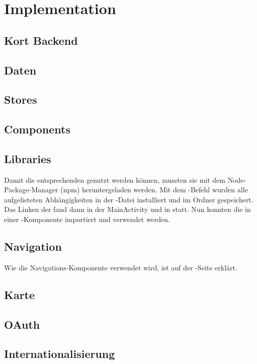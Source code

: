 \chapter{Implementation}
\label{pd-implementation}


\section{Kort Backend}


\section{Daten}


\section{Stores}


\section{Components}


\section{Libraries}
Damit die entsprechenden  genutzt werden können, mussten sie mit dem Node-Package-Manager (npm) heruntergeladen werden. 
Mit dem -Befehl wurden alle aufgelisteten Abhängigkeiten in der  -Datei installiert und im Ordner  gespeichert.
Das Linken der  fand dann in der MainActivity und in  statt. 
Nun konnten die  in einer -Komponente importiert und verwendet werden. 


\section{Navigation}
Wie die Navigations-Komponente verwendet wird, ist auf der -Seite erklärt. 



\section{Karte}


\section{OAuth}


\section{Internationalisierung}



